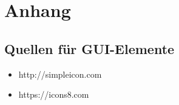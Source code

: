 \documentclass[pflichtenheft.tex]{subfiles}
\begin{document}
\chapter{Anhang}

\section{Quellen für GUI-Elemente}
\begin{itemize}
  \item http://simpleicon.com
  \item https://icons8.com
\end{itemize}

\begin{versionhistory}
\renewcommand \vhAuthorColWidth{1.2\hsize}
\renewcommand \vhChangeColWidth{0.4\hsize}
\end{versionhistory}
\end{document}
